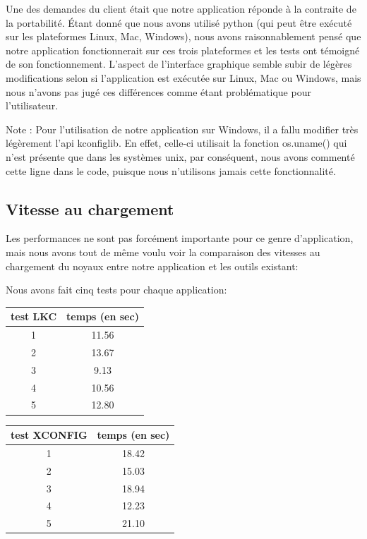 \documentclass[16pts]{report}
\begin{document}
Une des demandes du client était que notre application réponde à la contraite
de la portabilité. Étant donné que nous avons utilisé python (qui peut être 
exécuté sur les plateformes Linux, Mac, Windows), nous avons raisonnablement
pensé que notre application fonctionnerait sur ces trois plateformes et les tests
ont témoigné de son fonctionnement. L'aspect de l'interface graphique semble
subir de légères modifications selon si l'application est exécutée sur Linux,
Mac ou Windows, mais nous n'avons pas jugé ces différences comme étant
problématique pour l'utilisateur.

Note : Pour l'utilisation de notre application sur Windows, il a fallu modifier
très légèrement l'api kconfiglib. En effet, celle-ci utilisait la fonction
os.uname() qui n'est présente que dans les systèmes unix, par conséquent, nous
avons commenté cette ligne dans le code, puisque nous n'utilisons jamais cette 
fonctionnalité.



\subsection{Vitesse au chargement}

Les performances ne sont pas forcément importante pour ce genre d'application,
mais nous avons tout de même voulu voir la comparaison des vitesses au 
chargement du noyaux entre notre application et les outils existant:

Nous avons fait cinq tests pour chaque application:


\begin{tabular}{|c|c|}
\hline
test LKC & temps (en sec) \\
\hline
\hline
1 & 11.56 \\
\hline
2 & 13.67 \\
\hline
3 & 9.13 \\
\hline
4 & 10.56 \\
\hline
5 & 12.80 \\
\hline
\end{tabular}

\begin{tabular}{|c|c|}
\hline
test XCONFIG & temps (en sec) \\
\hline
\hline
1 & 18.42 \\
\hline
2 & 15.03 \\
\hline
3 & 18.94 \\
\hline
4 & 12.23 \\
\hline
5 & 21.10 \\
\hline
\end{tabular}
\end{document}
